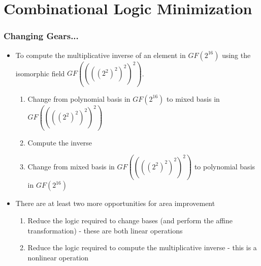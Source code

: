 \documentclass[handout,10pt]{beamer}
\begin{document}


\section{Combinational Logic Minimization}
\begin{frame}
	\frametitle{Changing Gears...}
	\begin{itemize}
		\item To compute the multiplicative inverse of an element in $GF(2^{16})$ using the isomorphic field $GF((((2^2)^2)^2)^2)$.
		\begin{enumerate}
			\item Change from polynomial basis in $GF(2^{16})$ to mixed basis in $GF((((2^2)^2)^2)^2)$
			\item Compute the inverse
			\item Change from mixed basis in $GF((((2^2)^2)^2)^2)$ to polynomial basis in $GF(2^{16})$
		\end{enumerate}
		\pause
		\item There are at least two more opportunities for area improvement
		\begin{enumerate}
			\item Reduce the logic required to change bases (and perform the affine transformation) - these are both linear operations
			\item Reduce the logic required to compute the multiplicative inverse - this is a nonlinear operation
		\end{enumerate}
	\end{itemize}
\end{frame}
\end{document}
